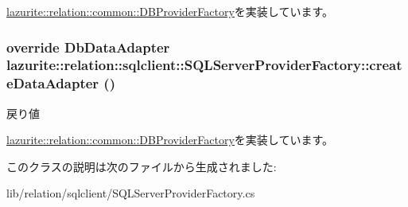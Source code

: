 \hyperlink{classlazurite_1_1relation_1_1common_1_1_d_b_provider_factory_a0b8ab4dd41d983170ee3c5903701597f}{lazurite::relation::common::DBProviderFactory}を実装しています。\hypertarget{classlazurite_1_1relation_1_1sqlclient_1_1_s_q_l_server_provider_factory_a7292de2fd61beaba65431210e7910be0}{
\subsubsection[{createDataAdapter}]{\setlength{\rightskip}{0pt plus 5cm}override DbDataAdapter lazurite::relation::sqlclient::SQLServerProviderFactory::createDataAdapter ()}}
\label{classlazurite_1_1relation_1_1sqlclient_1_1_s_q_l_server_provider_factory_a7292de2fd61beaba65431210e7910be0}
\begin{DoxyReturn}{戻り値}

\end{DoxyReturn}


\hyperlink{classlazurite_1_1relation_1_1common_1_1_d_b_provider_factory_a7343964afac875d0f5d665879c26f38f}{lazurite::relation::common::DBProviderFactory}を実装しています。

このクラスの説明は次のファイルから生成されました:\begin{DoxyCompactItemize}
\item 
lib/relation/sqlclient/SQLServerProviderFactory.cs\end{DoxyCompactItemize}
